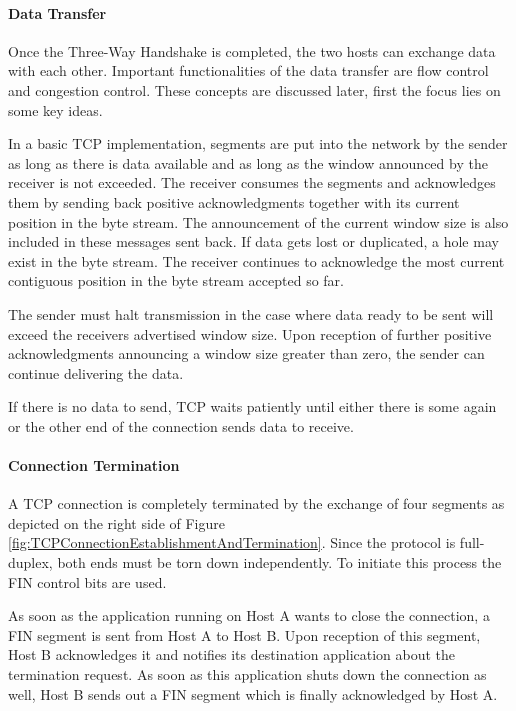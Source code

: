 \paragraph{Data Transfer}

Once the Three-Way Handshake is completed, the two hosts can exchange data with each other. Important functionalities of the data transfer are flow control and congestion control. These concepts are discussed later, first the focus lies on some key ideas.

In a basic TCP implementation, segments are put into the network by the sender as long as there is data available and as long as the window announced by the receiver is not exceeded. The receiver consumes the segments and acknowledges them by sending back positive acknowledgments together with its current position in the byte stream. The announcement of the current window size is also included in these messages sent back. If data gets lost or duplicated, a hole may exist in the byte stream. The receiver continues to acknowledge the most current contiguous position in the byte stream accepted so far.

The sender must halt transmission in the case where data ready to be sent will exceed the receivers advertised window size. Upon reception of further positive acknowledgments announcing a window size greater than zero, the sender can continue delivering the data.

If there is no data to send, TCP waits patiently until either there is some again or the other end of the connection sends data to receive.  

\paragraph{Connection Termination}

A TCP connection is completely terminated by the exchange of four segments as depicted on the right side of Figure \ref{fig:TCPConnectionEstablishmentAndTermination}. Since the protocol is full-duplex, both ends must be torn down independently. To initiate this process the FIN control bits are used. 

As soon as the application running on Host A wants to close the connection, a FIN segment is sent from Host A to Host B. Upon reception of this segment, Host B acknowledges it and notifies its destination application about the termination request. As soon as this application shuts down the connection as well, Host B sends out a FIN segment which is finally acknowledged by Host A.

